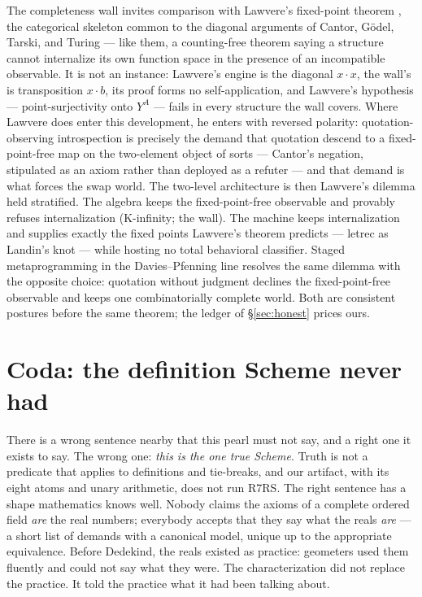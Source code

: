 \documentclass[acmsmall,screen,review]{acmart}
\begin{document}
The completeness wall invites comparison with Lawvere's fixed-point
theorem \cite{lawvere69}, the categorical skeleton common to the
diagonal arguments of Cantor, G\"odel, Tarski, and Turing
\cite{yanofsky03} --- like them, a counting-free theorem saying a
structure cannot internalize its own function space in the presence
of an incompatible observable. It is not an instance: Lawvere's
engine is the diagonal $x \cdot x$, the wall's is transposition
$x \cdot b$, its proof forms no self-application, and Lawvere's
hypothesis --- point-surjectivity onto $Y^A$ --- fails in every
structure the wall covers. Where Lawvere does enter this development,
he enters with reversed polarity: quotation-observing introspection
is precisely the demand that quotation descend to a fixed-point-free
map on the two-element object of sorts --- Cantor's negation,
stipulated as an axiom rather than deployed as a refuter --- and that
demand is what forces the swap world. The two-level architecture is
then Lawvere's dilemma held stratified. The algebra keeps the
fixed-point-free observable and provably refuses internalization
(K-infinity; the wall). The machine keeps internalization and
supplies exactly the fixed points Lawvere's theorem predicts ---
\textsf{letrec} as Landin's knot --- while hosting no total
behavioral classifier. Staged metaprogramming in the
Davies--Pfenning line \cite{davies01} resolves the same dilemma with
the opposite choice: quotation without judgment declines the
fixed-point-free observable and keeps one combinatorially complete
world. Both are consistent postures before the same theorem; the
ledger of \S\ref{sec:honest} prices ours.

\section{Coda: the definition Scheme never had}
\label{sec:coda}

There is a wrong sentence nearby that this pearl must not say, and a
right one it exists to say. The wrong one: \emph{this is the one true
Scheme}. Truth is not a predicate that applies to definitions and
tie-breaks, and our artifact, with its eight atoms and unary
arithmetic, does not run R7RS. The right sentence has a shape
mathematics knows well. Nobody claims the axioms of a complete
ordered field \emph{are} the real numbers; everybody accepts that
they say what the reals \emph{are} --- a short list of demands with a
canonical model, unique up to the appropriate equivalence. Before
Dedekind, the reals existed as practice: geometers used them
fluently and could not say what they were. The characterization did
not replace the practice. It told the practice what it had been
talking about.
\end{document}
